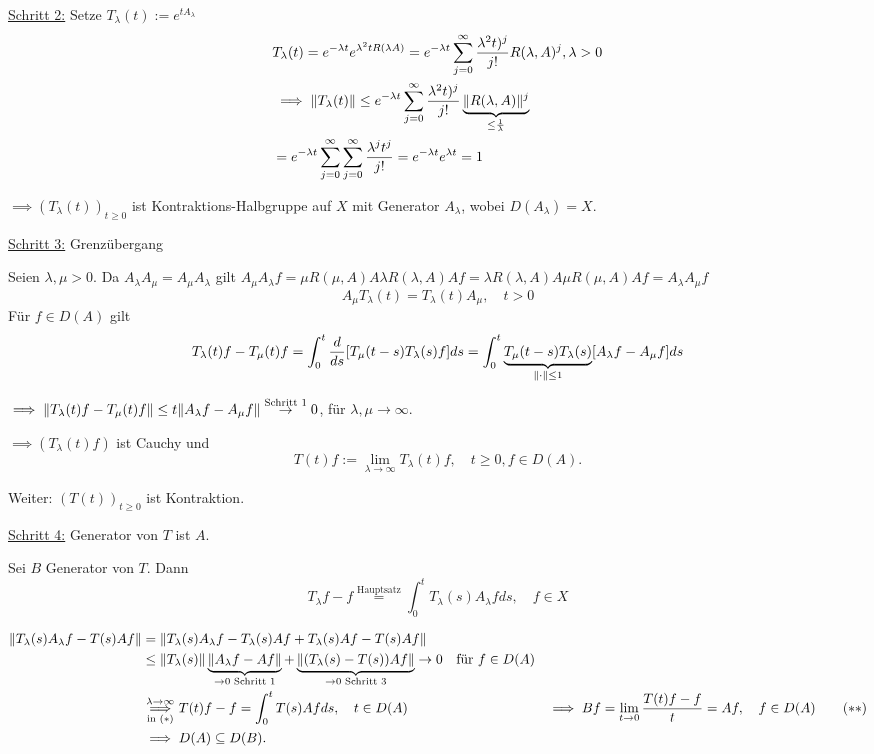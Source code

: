 \underline{Schritt 2:} Setze $T_\lambda(t) := e^{tA_\lambda}$
\begin{align*}
& T_\lambda(t) = e^{-\lambda t} e^{\lambda^2 t R(\lambda A)}
= e^{-\lambda t} \sum_{j = 0}^\infty \frac{\lambda^2 t)^j}{j!} R(\lambda, A)^j, \lambda > 0 \\
&\implies \lVert T_\lambda(t) \rVert \leq e^{-\lambda t } \sum_{j = 0}^\infty \frac{\lambda^2 t)^j}{j!} \underbrace{\lVert R(\lambda, A) \rVert^j}_{\leq \frac{1}{\lambda}} \\
&= e^{-\lambda t} \sum_{j = 0}^\infty \sum_{j = 0}^\infty \frac{\lambda^j t^j}{j!} = e^{-\lambda t} e^{\lambda t} = 1
\end{align*}

$\implies (T_\lambda(t))_{t \geq 0}$ ist Kontraktions-Halbgruppe auf $X$ mit Generator $A_\lambda$, wobei $D(A_\lambda) = X$.

\underline{Schritt 3:} Grenzübergang

Seien $\lambda, \mu > 0$.
Da $A_\lambda A_\mu = A_\mu A_\lambda$ gilt
{\tiny{$A_\mu A_\lambda f  =  \mu R(\mu, A) A \lambda R(\lambda, A) A f = \lambda R(\lambda, A) A \mu R(\mu, A) A  f = A_\lambda A_\mu f$}}
$$
A_\mu T_\lambda(t) = T_\lambda(t) A_\mu, \quad t >0
$$
Für $f \in D(A)$ gilt
$$
T_\lambda(t) f - T_\mu(t) f = \int_0^t \frac{d}{ds} [T_\mu(t - s) T_\lambda(s) f ] ds = \int_0^t \underbrace{T_\mu(t - s) T_\lambda(s)}_{\lVert \cdot \rVert \leq 1} [A_\lambda f - A_\mu f] ds
$$

$\implies \lVert T_\lambda(t) f - T_\mu(t) f  \rVert \leq t \lVert A_\lambda f - A_\mu f  \rVert \overset{\text{Schritt 1}}{\to} 0$, für $\lambda, \mu \to \infty$.

$\implies (T_\lambda(t) f)$ ist Cauchy und
$$
T(t) f := \lim_{\lambda \to \infty} T_\lambda(t) f, \quad t \geq 0, f \in D(A).
$$ 

Weiter: $(T(t))_{t \geq 0}$ ist Kontraktion.

\underline{Schritt 4:} Generator von $T$ ist $A$.

Sei $B$ Generator von $T$. Dann
\begin{displaymath}
T_\lambda f - f \overset{\text{Hauptsatz}}{=} \int_0^t T_\lambda(s) A_\lambda f ds, \quad f \in X \tag{$\ast$}
\end{displaymath}

\begin{align*}
\lVert T_\lambda(s) A_\lambda f - T(s) A f \rVert
&= \lVert T_\lambda(s) A_\lambda f - T_\lambda(s)Af + T_\lambda(s) Af - T(s) Af  \rVert \\
&\leq \lVert T_\lambda(s)  \rVert \underbrace{\lVert A_\lambda f - A f \rVert}_{\to 0 \text{ Schritt 1}} + \underbrace{\lVert (T_\lambda(s) - T(s))Af  \rVert}_{\to 0 \text{ Schritt 3}} \to 0 \quad\text{für } f \in D(A) \\
&\overset{\lambda \to \infty}{\underset{\text{in ($\ast$)}}{\implies}} T(t) f - f = \int_0^t T(s) A f ds, \quad t \in D(A)
&\implies  Bf = \lim_{t \to 0} \frac{ T(t) f - f}{t} = Af, \quad f \in D(A) \tag{$\ast\ast$} \\
&\implies D(A) \subseteq D(B).
\end{align*}

